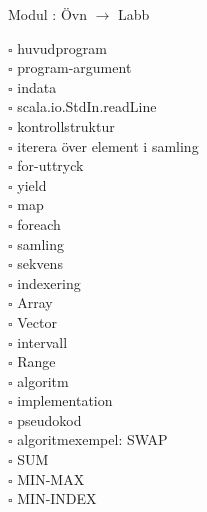 
    Modul : Övn  $\rightarrow$ Labb \Alert{\texttt{--}}
    \begin{multicols}{3}\SlideFontTiny
    $\square$ huvudprogram \\
$\square$ program-argument \\
$\square$ indata \\
$\square$ scala.io.StdIn.readLine \\
$\square$ kontrollstruktur \\
$\square$ iterera över element i samling \\
$\square$ for-uttryck \\
$\square$ yield \\
$\square$ map \\
$\square$ foreach \\
$\square$ samling \\
$\square$ sekvens \\
$\square$ indexering \\
$\square$ Array \\
$\square$ Vector \\
$\square$ intervall \\
$\square$ Range \\
$\square$ algoritm \\
$\square$ implementation \\
$\square$ pseudokod \\
$\square$ algoritmexempel: SWAP \\
$\square$ SUM \\
$\square$ MIN-MAX \\
$\square$ MIN-INDEX \\
    \end{multicols}
    
